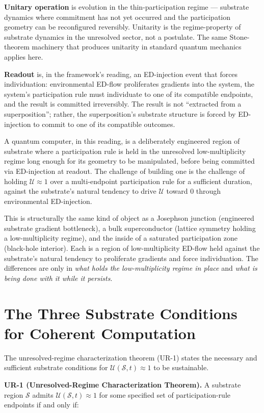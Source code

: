 \documentclass[11pt,a4paper]{article}
\begin{document}
\textbf{Unitary operation} is evolution in the thin-participation regime --- substrate dynamics where commitment has not yet occurred and the participation geometry can be reconfigured reversibly. Unitarity is the regime-property of substrate dynamics in the unresolved sector, not a postulate. The same Stone-theorem machinery that produces unitarity in standard quantum mechanics applies here.

\textbf{Readout} is, in the framework's reading, an ED-injection event that forces individuation: environmental ED-flow proliferates gradients into the system, the system's participation rule must individuate to one of its compatible endpoints, and the result is committed irreversibly. The result is not ``extracted from a superposition''; rather, the superposition's substrate structure is forced by ED-injection to commit to one of its compatible outcomes.

A quantum computer, in this reading, is a deliberately engineered region of substrate where a participation rule is held in the unresolved low-multiplicity regime long enough for its geometry to be manipulated, before being committed via ED-injection at readout. The challenge of building one is the challenge of holding $\mathcal{U} \approx 1$ over a multi-endpoint participation rule for a sufficient duration, against the substrate's natural tendency to drive $\mathcal{U}$ toward 0 through environmental ED-injection.

This is structurally the same kind of object as a Josephson junction (engineered substrate gradient bottleneck), a bulk superconductor (lattice symmetry holding a low-multiplicity regime), and the inside of a saturated participation zone (black-hole interior). Each is a region of low-multiplicity ED-flow held against the substrate's natural tendency to proliferate gradients and force individuation. The differences are only in \emph{what holds the low-multiplicity regime in place} and \emph{what is being done with it while it persists}.

\section{The Three Substrate Conditions for Coherent Computation}

The unresolved-regime characterization theorem (UR-1) states the necessary and sufficient substrate conditions for $\mathcal{U}(\mathcal{S}, t) \approx 1$ to be sustainable.

\textbf{UR-1 (Unresolved-Regime Characterization Theorem).} A substrate region $\mathcal{S}$ admits $\mathcal{U}(\mathcal{S}, t) \approx 1$ for some specified set of participation-rule endpoints if and only if:
\end{document}
